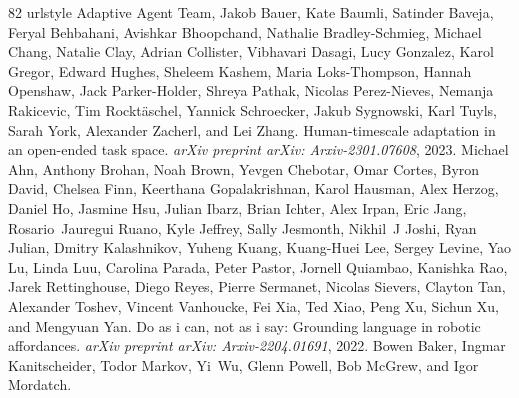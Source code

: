 \documentclass{article}
\begin{document}
\begin{thebibliography}{82}
\providecommand{\natexlab}[1]{#1}
\providecommand{\url}[1]{\texttt{#1}}
\expandafter\ifx\csname urlstyle\endcsname\relax
  \providecommand{\doi}[1]{doi: #1}\else
  \providecommand{\doi}{doi: \begingroup \urlstyle{rm}\Url}\fi
{}
{Adaptive Agent Team}, Jakob Bauer, Kate Baumli, Satinder Baveja, Feryal Behbahani, Avishkar Bhoopchand, Nathalie Bradley-Schmieg, Michael Chang, Natalie Clay, Adrian Collister, Vibhavari Dasagi, Lucy Gonzalez, Karol Gregor, Edward Hughes, Sheleem Kashem, Maria Loks-Thompson, Hannah Openshaw, Jack Parker-Holder, Shreya Pathak, Nicolas Perez-Nieves, Nemanja Rakicevic, Tim Rocktäschel, Yannick Schroecker, Jakub Sygnowski, Karl Tuyls, Sarah York, Alexander Zacherl, and Lei Zhang.
\newblock Human-timescale adaptation in an open-ended task space.
\newblock \emph{arXiv preprint arXiv: Arxiv-2301.07608}, 2023.
Michael Ahn, Anthony Brohan, Noah Brown, Yevgen Chebotar, Omar Cortes, Byron David, Chelsea Finn, Keerthana Gopalakrishnan, Karol Hausman, Alex Herzog, Daniel Ho, Jasmine Hsu, Julian Ibarz, Brian Ichter, Alex Irpan, Eric Jang, Rosario~Jauregui Ruano, Kyle Jeffrey, Sally Jesmonth, Nikhil~J Joshi, Ryan Julian, Dmitry Kalashnikov, Yuheng Kuang, Kuang-Huei Lee, Sergey Levine, Yao Lu, Linda Luu, Carolina Parada, Peter Pastor, Jornell Quiambao, Kanishka Rao, Jarek Rettinghouse, Diego Reyes, Pierre Sermanet, Nicolas Sievers, Clayton Tan, Alexander Toshev, Vincent Vanhoucke, Fei Xia, Ted Xiao, Peng Xu, Sichun Xu, and Mengyuan Yan.
\newblock Do as i can, not as i say: Grounding language in robotic affordances.
\newblock \emph{arXiv preprint arXiv: Arxiv-2204.01691}, 2022.
Bowen Baker, Ingmar Kanitscheider, Todor Markov, Yi~Wu, Glenn Powell, Bob McGrew, and Igor Mordatch.

\end{thebibliography}
\end{document}

